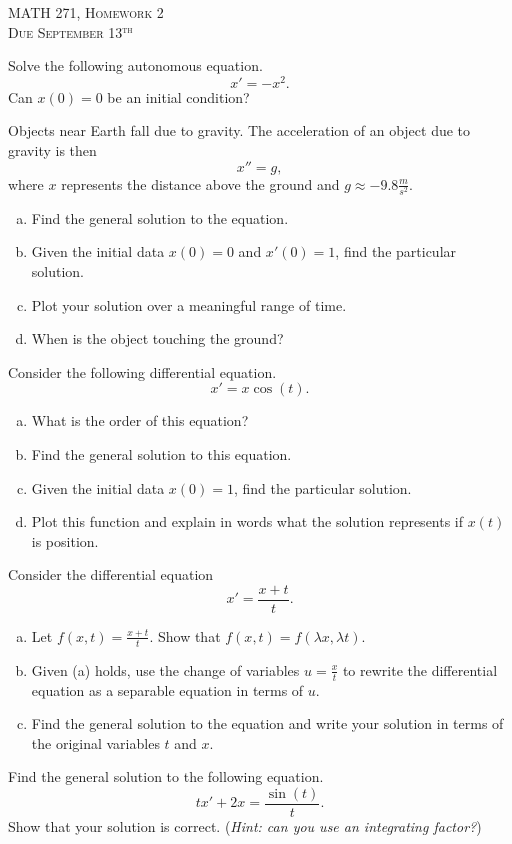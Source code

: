 \documentclass[12pt]{article} %
\begin{document}
\begin{center}
   \textsc{\large MATH 271, Homework 2}\\
   \textsc{Due September 13$^\textrm{th}$}
\end{center}
\vspace{.5cm}

\begin{problem}
    Solve the following autonomous equation.
    \[
    x'=-x^2.
    \]
    Can $x(0)=0$ be an initial condition?
\end{problem}

\begin{problem}
Objects near Earth fall due to gravity.  The acceleration of an object due to gravity is then
\[
x''=g,
\]
where $x$ represents the distance above the ground and $g\approx -9.8\frac{m}{s^2}$.  
\begin{enumerate}[(a)]
    \item Find the general solution to the equation.
    \item Given the initial data $x(0)=0$ and $x'(0)=1$, find the particular solution.
    \item Plot your solution over a meaningful range of time.
    \item When is the object touching the ground?
\end{enumerate}

\end{problem}

\begin{problem}
Consider the following differential equation.
\[
x' = x\cos(t).
\]
\begin{enumerate}[(a)]
    \item What is the order of this equation?
    \item Find the general solution to this equation.
    \item Given the initial data $x(0)=1$, find the particular solution.
    \item Plot this function and explain in words what the solution represents if $x(t)$ is position.
\end{enumerate}
\end{problem}

\begin{problem}
Consider the differential equation
\[
x'=\frac{x+t}{t}.
\]
\begin{enumerate}[(a)]
    \item Let $f(x,t)=\frac{x+t}{t}$. Show that $f(x,t)=f(\lambda x, \lambda t)$.
    \item Given (a) holds, use the change of variables $u=\frac{x}{t}$ to rewrite the differential equation as a separable equation in terms of $u$.
    \item Find the general solution to the equation and write your solution in terms of the original variables $t$ and $x$.
\end{enumerate}
\end{problem}

\begin{problem}
Find the general solution to the following equation.
\[
tx'+2x=\frac{\sin(t)}{t}.
\]
Show that your solution is correct. (\emph{Hint: can you use an integrating factor?})
\end{problem}
\end{document}

